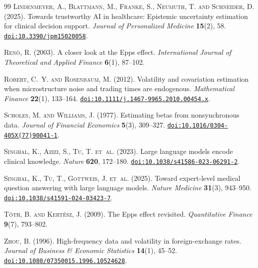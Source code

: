 \documentclass[reqno, 12pt]{amsart}
\newcommand{\doi}[1]{\href{https://doi.org/#1}{\texttt{doi:#1}}}
\theoremstyle{plain}
\theoremstyle{definition}
\theoremstyle{remark}
\begin{document}
\begin{thebibliography}{99}
\textsc{Lindenmeyer, A., Blattmann, M., Franke, S., Neumuth, T.
  and Schneider, D.} (2025).
Towards trustworthy {AI} in healthcare: Epistemic uncertainty
estimation for clinical decision support.
\textit{Journal of Personalized Medicine} \textbf{15}(2), 58.
\doi{10.3390/jpm15020058}.

\textsc{Ren\`{o}, R.} (2003).
A closer look at the {Epps} effect.
\textit{International Journal of Theoretical and Applied Finance}
\textbf{6}(1), 87--102.

\textsc{Robert, C.~Y. and Rosenbaum, M.} (2012).
Volatility and covariation estimation when microstructure noise and
trading times are endogenous.
\textit{Mathematical Finance} \textbf{22}(1), 133--164.
\doi{10.1111/j.1467-9965.2010.00454.x}.

\textsc{Scholes, M. and Williams, J.} (1977).
Estimating betas from nonsynchronous data.
\textit{Journal of Financial Economics} \textbf{5}(3), 309--327.
\doi{10.1016/0304-405X(77)90041-1}.

\textsc{Singhal, K., Azizi, S., Tu, T. et~al.} (2023).
Large language models encode clinical knowledge.
\textit{Nature} \textbf{620}, 172--180.
\doi{10.1038/s41586-023-06291-2}.

\textsc{Singhal, K., Tu, T., Gottweis, J. et~al.} (2025).
Toward expert-level medical question answering with large language
models.
\textit{Nature Medicine} \textbf{31}(3), 943--950.
\doi{10.1038/s41591-024-03423-7}.

\textsc{T\'{o}th, B. and Kert\'{e}sz, J.} (2009).
The {Epps} effect revisited.
\textit{Quantitative Finance} \textbf{9}(7), 793--802.

\textsc{Zhou, B.} (1996).
High-frequency data and volatility in foreign-exchange rates.
\textit{Journal of Business \& Economic Statistics}
\textbf{14}(1), 45--52.
\doi{10.1080/07350015.1996.10524628}.

\end{thebibliography}
\end{document}
